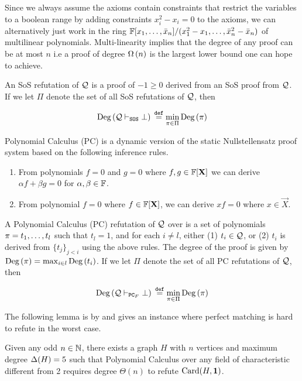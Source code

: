 \documentclass[11pt]{article}
\begin{document}
Since we always assume the axioms contain constraints that restrict the variables to a boolean range by adding constraints $x_i^2 - x_i=0$ to the axioms, we can alternatively just work in the ring $\mathbb{F}[x_1, \dots, \bar{x}_n]/(x_1^2 - x_1, \dots, \bar{x}_n^2 - \bar{x}_n)$ of multilinear polynomials.
Multi-linearity implies that the degree of any proof can be at most $n$ i.e a proof of degree $\Omega\left(n\right)$ is the largest lower bound one can hope to achieve.

\begin{definition}
An SoS refutation of $\mathcal{Q}$ is a proof of $-1 \geq 0$ derived from an SoS proof from $\mathcal{Q}$. If we let $\Pi$ denote the set of all SoS refutations of $\mathcal{Q}$, then  

\[ \text{Deg}\left(\mathcal{Q} \vdash_{\texttt{SOS}} \bot\right) \text{}\overset{\mathtt{def}}{=} \min_{\pi \in \Pi}\text{Deg}\left(\pi\right)\]
	
\end{definition}

Polynomial Calculus (PC) is a dynamic version of the static Nullstellensatz proof system \citep[Section 1.3]{fleming2019semialgebraic} based on the following inference rules.
\begin{enumerate}
	\item From polynomials $f=0$ and $g=0$ where $f,g \in \mathbb{F}[\mathbf{X}]$ we can derive $\alpha f + \beta g = 0$ for $\alpha, \beta \in \mathbb{F}$.
	\item From polynomial $f=0$ where $f \in \mathbb{F}[\mathbf{X}]$, we can derive $xf=0$ where $x \in \vec{X}$.
\end{enumerate}

\begin{definition}\label{def:poly-calc-refutations}
A Polynomial Calculus (PC) refutation of $\mathcal{Q}$ over is a set of polynomials $\pi = t_1, \dots, t_l$	such that $t_l = 1$, and for each $i \neq l$, either (1) $t_i \in \mathcal{Q}$, or (2) $t_i$ is derived from $\{t_j\}_{j < i}$ using the above rules. 
The degree of the proof is given by $\text{Deg}\left(\pi\right) = \max_{i \in l}\text{Deg}\left(t_i\right)$. If we let $\Pi$ denote the set of all PC refutations of $\mathcal{Q}$, then  

\[ \text{Deg}\left(\mathcal{Q} \vdash_{\texttt{PC}_F} \bot\right) \text{}\overset{\mathtt{def}}{=} \min_{\pi \in \Pi}\text{Deg}\left(\pi\right)\]
\end{definition}

The following lemma is by \citet{buss1999linear} and gives an instance where perfect matching is hard to refute in the worst case.
\begin{lemma}\label{lemma:worst-case-instance-PC}Given any odd $n \in \mathbb{N}$, there exists a graph $H$ with $n$ vertices and maximum degree $\Delta(H)= 5$ such that Polynomial Calculus over any field of characteristic different from 2 requires degree $\Theta(n)$ to refute $\text{Card}(H, \mathbf{1})$.
\end{lemma}
\end{document}
